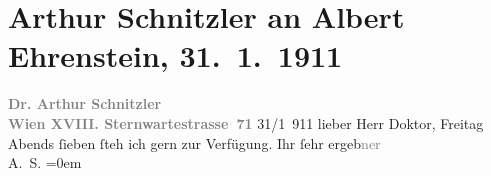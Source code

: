 

               \section[Arthur Schnitzler an Albert Ehrenstein, 31. 1. 1911]{ Arthur Schnitzler an Albert Ehrenstein,
                    31. 1. 1911}\nopagebreak{}\rehead{ }\begin{ledgroupsized}[t]{13cm}\normalsize\beginnumbering{} \toendnotes[C]{\smallbreak\pagebreak[2]} 
\pstart
           \noindent{}{\pb}\textcolor{gray}{\textbf{Dr. Arthur Schnitzler}}{\\}\textcolor{gray}{\textbf{Wien XVIII. Sternwartestrasse 71}}\pend
           \pstart
           \raggedleft{}31/1 911\pend
           \pstart{}lieber Herr Doktor,\pend\pstart
           Freitag Abends ſieben ſteh ich gern zur Verfügung.\pend
           \pstart
           Ihr ſehr ergeb\textcolor{gray}{ner}{\\[\baselineskip]}\spacefill\mbox{A. S.}\pend
           \leftskip=0em{}\endnumbering{}\end{ledgroupsized}  \newcommand{\dateiname}{L02001}\newcommand{\titel}{Arthur Schnitzler an Albert Ehrenstein, 31. 1. 1911}\newcommand{\editorInnen}{Martin Anton Müller und Gerd-Hermann Susen}
      